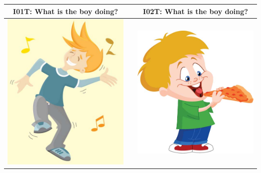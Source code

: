 \documentclass[12pt,notitlepage]{article}
\date{}
\begin{document}

\begin{center}
\begin{tabular}{|c|c|c|}
\hline
I01T: What is the boy doing? && I02T: What is the boy doing? \\
\hline
\includegraphics[width=20em,trim=0 0 0 -3]{figures/I01.jpg} & & \includegraphics[width=20em,trim=0 0 0 -3]{figures/I02.jpg} \\
\hline
\end{tabular}
\vspace{1em} \\



\end{center}
\end{document}

